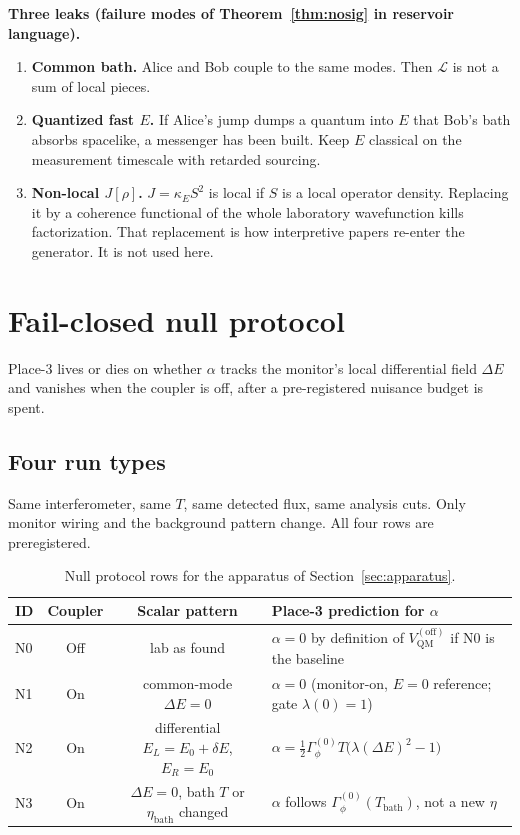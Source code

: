 \documentclass[11pt]{article}
\theoremstyle{definition}
\theoremstyle{plain}
\begin{document}
\textbf{Three leaks (failure modes of Theorem~\ref{thm:nosig} in reservoir language).}
\begin{enumerate}
\item \textbf{Common bath.} Alice and Bob couple to the same modes. Then $\mathcal{L}$ is not a sum of
local pieces.\cite{Gisin1,Polchinski}
\item \textbf{Quantized fast $E$.} If Alice's jump dumps a quantum into $E$ that Bob's bath absorbs
spacelike, a messenger has been built. Keep $E$ classical on the measurement timescale with
retarded sourcing.
\item \textbf{Non-local $J[\rho]$.} $J = \kappa_E S^2$ is local if $S$ is a local operator density. Replacing it
by a coherence functional of the whole laboratory wavefunction kills factorization. That replacement
is how interpretive papers re-enter the generator. It is not used here.
\end{enumerate}

\section{Fail-closed null protocol}\label{sec:protocol}

Place-3 lives or dies on whether $\alpha$ tracks the monitor's local differential field $\Delta E$ and
vanishes when the coupler is off, after a pre-registered nuisance budget is spent.

\subsection{Four run types}

Same interferometer, same $T$, same detected flux, same analysis cuts. Only monitor wiring and
the background pattern change. All four rows are preregistered.

\begin{table}[h]
\centering
\small
\caption{Null protocol rows for the apparatus of Section~\ref{sec:apparatus}.}
\label{tab:protocol}
\begin{tabular}{p{0.35in}ccp{3.4in}}
\hline
\textbf{ID} & \textbf{Coupler} & \textbf{Scalar pattern} & \textbf{Place-3 prediction for $\alpha$}\\
\hline
N0 & Off & lab as found & $\alpha = 0$ by definition of $V_{\mathrm{QM}}^{(\mathrm{off})}$ if N0 is the baseline\\
N1 & On & common-mode $\Delta E = 0$ & $\alpha = 0$ (monitor-on, $E{=}0$ reference; gate $\lambda(0)=1$)\\
N2 & On & differential $E_L = E_0{+}\delta E$, $E_R = E_0$ & $\alpha = \tfrac12 \Gamma_\phi^{(0)} T \big( \lambda(\Delta E)^2 - 1 \big)$\\
N3 & On & $\Delta E = 0$, bath $T$ or $\eta_{\mathrm{bath}}$ changed & $\alpha$ follows $\Gamma_\phi^{(0)}(T_{\mathrm{bath}})$, not a new $\eta$\\
\hline
\end{tabular}
\end{table}
\end{document}
